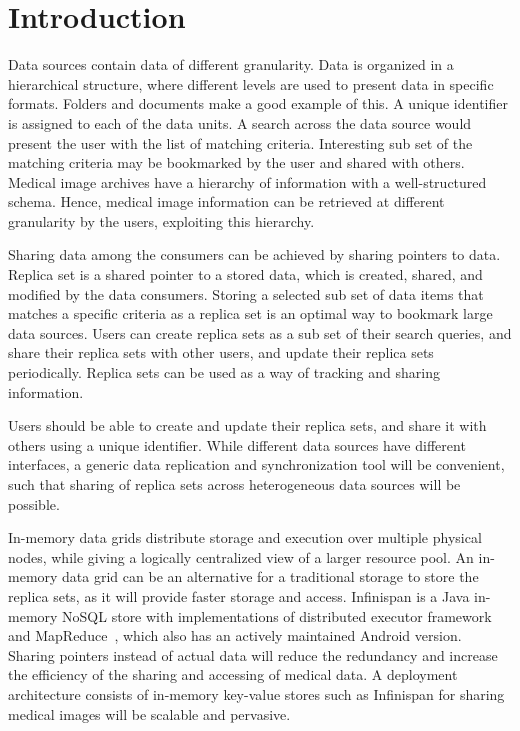 \documentclass[conference]{IEEEtran}
\begin{document}
\IEEEpeerreviewmaketitle

\section{Introduction}
Data sources contain data of different granularity. Data is organized in a hierarchical structure, where different levels are used to present data in specific formats. Folders and documents make a good example of this. A unique identifier is assigned to each of the data units. A search across the data source would present the user with the list of matching criteria. Interesting sub set of the matching criteria may be bookmarked by the user and shared with others. Medical image archives have a hierarchy of information with a well-structured schema. Hence, medical image information can be retrieved at different granularity by the users, exploiting this hierarchy.

Sharing data among the consumers can be achieved by sharing pointers to data. Replica set is a shared pointer to a stored data, which is created, shared, and modified by the data consumers. Storing a selected sub set of data items that matches a specific criteria as a replica set is an optimal way to bookmark large data sources. Users can create replica sets as a sub set of their search queries, and share their replica sets with other users, and update their replica sets periodically. Replica sets can be used as a way of tracking and sharing information.

Users should be able to create and update their replica sets, and share it with others using a unique identifier. While different data sources have different interfaces, a generic data replication and synchronization tool will be convenient, such that sharing of replica sets across heterogeneous data sources will be possible. 

In-memory data grids distribute storage and execution over multiple physical nodes, while giving a logically centralized view of a larger resource pool. An in-memory data grid can be an alternative for a traditional storage to store the replica sets, as it will provide faster storage and access. Infinispan is a Java in-memory NoSQL store with implementations of distributed executor framework and MapReduce~\cite{infinispan}, which also has an actively maintained Android version. Sharing pointers instead of actual data will reduce the redundancy and increase the efficiency of the sharing and accessing of medical data. A deployment architecture consists of in-memory key-value stores such as Infinispan for sharing medical images will be scalable and pervasive.
\end{document}
